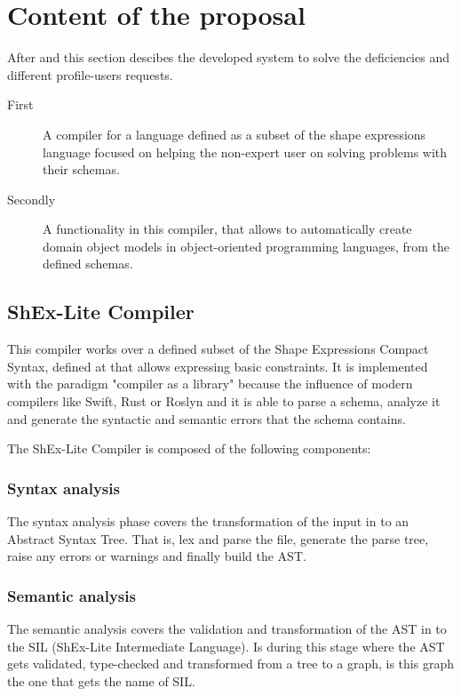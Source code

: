 \section{Content of the proposal}

After  and  this section descibes the developed system to solve the deficiencies and different profile-users requests.

\begin{description}
  \item[First] A compiler for a language defined as a subset of the shape expressions language focused on helping the non-expert user on solving problems with their schemas.
  \item[Secondly] A functionality in this compiler, that allows to automatically create domain object models in object-oriented programming languages, from the defined schemas.
\end{description}

\subsection{ShEx-Lite Compiler}
This compiler works over a defined subset of the Shape Expressions Compact Syntax, defined at  that allows expressing basic constraints. It is implemented with the paradigm "compiler as a library" because the influence of modern compilers like Swift, Rust or Roslyn  and it is able to parse a schema, analyze it and generate the syntactic and semantic errors that the schema contains.

The ShEx-Lite Compiler is composed of the following components:

\subsubsection{Syntax analysis}
The syntax analysis phase covers the transformation of the input in to an Abstract Syntax Tree. That is, lex and parse the file, generate the parse tree, raise any errors or warnings and finally build the AST.

\subsubsection{Semantic analysis}
The semantic analysis covers the validation and transformation of the AST in to the SIL (ShEx-Lite Intermediate Language). Is during this stage where the AST gets validated, type-checked and transformed from a tree to a graph, is this graph the one that gets the name of SIL.




